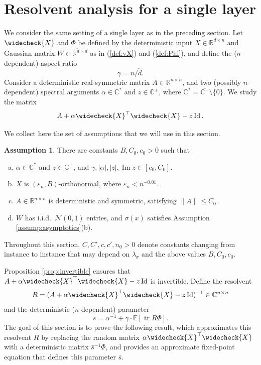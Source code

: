 \documentclass{article}
\theoremstyle{definition}
\newtheorem{assumption}[theorem]{Assumption}
\newcommand{\R}{\mathbb{R}}
\newcommand{\C}{\mathbb{C}}
\newcommand{\N}{\mathcal{N}}
\newcommand{\E}{\mathbb{E}}
\newcommand{\Id}{\operatorname{Id}}
\newcommand{\tr}{\operatorname{tr}}
\newcommand{\eps}{\varepsilon}
\newcommand{\vd}{\check{d}}
\newcommand{\vX}{\widecheck{X}}
\newcommand{\1}{\mathbf{1}}
\renewcommand{\Im}{\operatorname{Im}}
\begin{document}
\section{Resolvent analysis for a single layer}\label{appendix:singlelayer}

We consider the same setting of a single layer as in the preceding section.
Let $\vX$ and $\Phi$ be defined by the
deterministic input $X \in \R^{d \times n}$ and Gaussian 
matrix $W \in \R^{\vd \times d}$ as in
(\ref{def:vX}) and (\ref{def:Phi}), and define the ($n$-dependent) aspect ratio
\[\gamma=n/\vd.\]
Consider a deterministic real-symmetric matrix $A \in \R^{n \times n}$, and
two (possibly $n$-dependent) spectral arguments
$\alpha \in \C^*$ and $z \in \C^+$, where
$\C^*=\overline{\C^-} \setminus \{0\}$. We study the matrix
\[A+\alpha \vX^\top \vX-z\Id.\]

We collect here the set of assumptions that we will use in this section.
\begin{assumption}\label{assump:singlelayer}
There are constants $B,C_0,c_0>0$ such that
\begin{enumerate}[(a)]
\item $\alpha \in \C^*$ and $z \in \C^+$, and
$\gamma,|\alpha|,|z|,\Im z \in [c_0,C_0]$.
\item $X$ is $(\eps_n,B)$-orthonormal, where $\eps_n<n^{-0.01}$.
\item $A \in \R^{n \times n}$ is deterministic and symmetric,
satisfying $\|A\| \leq C_0$.
\item $W$ has i.i.d.\ $\N(0,1)$ entries, and $\sigma(x)$ satisfies Assumption
\ref{assump:asymptotics}(b).
\end{enumerate}
\end{assumption}
Throughout this section, $C,C',c,c',n_0>0$ denote constants changing from
instance to instance that may depend on $\lambda_\sigma$ and the above
values $B,C_0,c_0$.

Proposition \ref{prop:invertible} ensures that $A+\alpha\vX^\top\vX-z\Id$
is invertible. Define the resolvent
\begin{equation}\label{eq:resolvent}
R=(A+\alpha \vX^\top \vX-z\Id)^{-1} \in \C^{n \times n}
\end{equation} 
and the deterministic ($n$-dependent) parameter
\begin{equation}\label{eq:sbar}
\bar{s}=\alpha^{-1}+\gamma \cdot \E[\tr R\Phi].
\end{equation}
The goal of this section is to prove the following result, which approximates
this resolvent $R$ by replacing the random matrix $\alpha \vX^\top \vX$ with a
deterministic matrix $\bar{s}^{-1}\Phi$, and provides an approximate fixed-point
equation that defines this parameter $\bar{s}$.
\end{document}
